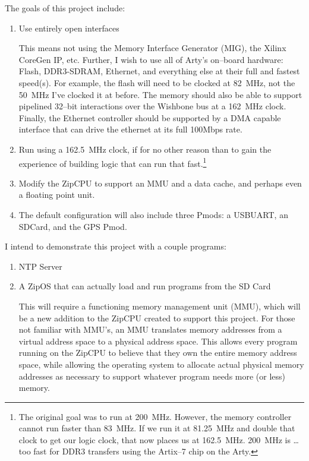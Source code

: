 \documentclass{gqtekspec}
\begin{document}
The goals of this project include:
\begin{enumerate}
\item Use entirely open interfaces

	This means not using the Memory Interface Generator (MIG), the
	Xilinx CoreGen IP, etc.  Further, I wish to use all of Arty's on--board
	hardware: Flash, DDR3-SDRAM, Ethernet, and everything else at their
	full and fastest speed(s).  For example, the flash will need to be
	clocked at 82~MHz, not the 50~MHz I've clocked it at before.  The
	memory should also be able to support pipelined 32--bit interactions
	over the Wishbone bus at a 162~MHz clock.  Finally, the Ethernet
	controller should be supported by a DMA capable interface that can
	drive the ethernet at its full 100Mbps rate.

\item Run using a 162.5~MHz clock, if for no other reason than to gain the
	experience of building logic that can run that fast.\footnote{The
	original goal was to run at 200~MHz.  However, the memory controller
	cannot run faster than 83~MHz.  If we run it at 81.25~MHz and double
	that clock to get our logic clock, that now places us at 162.5~MHz.
	200~MHz is \ldots too fast for DDR3 transfers using the Artix--7 chip
	on the Arty.}

\item Modify the ZipCPU to support an MMU and a data cache, and perhaps even
	a floating point unit.

\item The default configuration will also include three Pmods: a USBUART,
	an SDCard, and the GPS Pmod.
\end{enumerate}

I intend to demonstrate this project with a couple programs:
\begin{enumerate}
\item NTP Server
\item A ZipOS that can actually load and run programs from the SD Card

	This will require a functioning memory management unit (MMU), which
	will be a new addition to the ZipCPU created to support this project.
	For those not familiar with MMU's, an MMU translates memory addresses
	from a virtual address space to a physical address space.  This allows
	every program running on the ZipCPU to believe that they own the entire
	memory address space, while allowing the operating system to allocate
	actual physical memory addresses as necessary to support whatever
	program needs more (or less) memory.
\end{enumerate}
\end{document}
